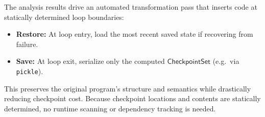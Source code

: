 The analysis results drive an automated transformation pass that inserts code at statically determined loop boundaries:
\begin{itemize}
    \item \textbf{Restore:} At loop entry, load the most recent saved state if recovering from failure.
    \item \textbf{Save:} At loop exit, serialize only the computed $\mathsf{CheckpointSet}$ (e.g.\ via \texttt{pickle}).
\end{itemize}
This preserves the original program’s structure and semantics while drastically reducing checkpoint cost. Because checkpoint locations and contents are statically determined, no runtime scanning or dependency tracking is needed.
